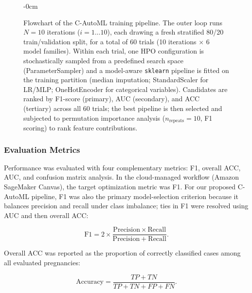 \documentclass[diagnostics,article,submit,pdftex,moreauthors]{Definitions/mdpi}
\begin{document}
\begin{figure}[H]
\begin{adjustwidth}{-\extralength}{0cm}
\begin{tikzpicture}
\end{tikzpicture}
\end{adjustwidth}
\caption{Flowchart of the \ac{C-AutoML} training
    pipeline. The outer loop runs $N = 10$ iterations
    ($i = 1\ldots10$), each drawing a fresh stratified 80/20
    train/validation split, for a total of 60 trials
    (10 iterations $\times$ 6 model families). Within each trial, one
    \acf{HPO} configuration is stochastically sampled from a
    predefined search space (ParameterSampler) and a model-aware
    \texttt{sklearn} pipeline is fitted on the training partition
    (median imputation; StandardScaler for \ac{LR}/\ac{MLP};
    OneHotEncoder for categorical variables). Candidates are ranked by
    F1-score (primary), \ac{AUC} (secondary), and \ac{ACC} (tertiary)
    across all 60 trials; the best pipeline is then selected and
    subjected to permutation importance analysis
    ($n_{\mathrm{repeats}} = 10$, F1 scoring) to rank feature
    contributions.}
\label{fig:c-automl-flowchart}
\end{figure}

\subsubsection{Evaluation Metrics}
\label{sec:evaluation-metrics}
Performance was evaluated with four complementary metrics: \ac{F1},
overall \ac{ACC}, \ac{AUC}, and confusion matrix analysis. In the
cloud-managed workflow (Amazon SageMaker Canvas), the target
optimization metric was \ac{F1}. For our proposed \ac{C-AutoML} pipeline,
\ac{F1} was also the primary model-selection criterion because it
balances precision and recall under class imbalance; ties in \ac{F1}
were resolved using \ac{AUC} and then overall \ac{ACC}:

\begin{linenomath}
\begin{equation}
\mathrm{F1}=2\times\frac{\mathrm{Precision}\times\mathrm{Recall}}{\mathrm{Precision}+\mathrm{Recall}}.
\label{eq:f1-score}
\end{equation}
\end{linenomath}

Overall \ac{ACC} was reported as the proportion of correctly
classified cases among all evaluated pregnancies:

\begin{linenomath}
\begin{equation}
\mathrm{Accuracy}=\frac{TP+TN}{TP+TN+FP+FN}.
\label{eq:accuracy}
\end{equation}
\end{linenomath}
\end{document}
